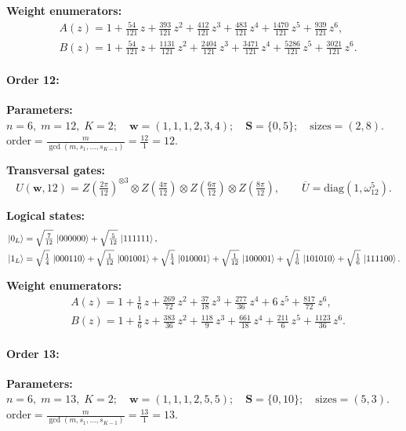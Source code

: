\documentclass[pdflatex,sn-nature]{sn-jnl}%
\theoremstyle{thmstyleone}%
\theoremstyle{thmstyletwo}%
\theoremstyle{thmstylethree}%
\begin{document}
\begin{appendices}
\noindent\textbf{Weight enumerators:}
\begin{align*}
    &A(z) = 1 + \tfrac{54}{121}\,z + \tfrac{393}{121}\,z^{2} + \tfrac{412}{121}\,z^{3} + \tfrac{483}{121}\,z^{4} + \tfrac{1470}{121}\,z^{5} + \tfrac{939}{121}\,z^{6}, \\
    &B(z) = 1 + \tfrac{54}{121}\,z + \tfrac{1131}{121}\,z^{2} + \tfrac{2404}{121}\,z^{3} + \tfrac{3471}{121}\,z^{4} + \tfrac{5286}{121}\,z^{5} + \tfrac{3021}{121}\,z^{6}.
\end{align*}

\paragraph{\textbf{Order 12:}}
\noindent\textbf{Parameters:} $n=6,\; m=12,\; K=2;\quad \mathbf w=(1, 1, 1, 2, 3, 4);\quad \mathbf S=\{0, 5\};\quad \text{sizes}=\left(2, 8\right).$ $\displaystyle \text{order}=\frac{m}{\gcd(m,s_1,\dots,s_{K-1})}=\frac{12}{1}=12.$

\noindent\textbf{Transversal gates:}
\[
    U(\mathbf w,12)=Z \left(\tfrac{2\pi}{12}\right)^{\otimes3} \otimes Z \left(\tfrac{4\pi}{12}\right) \otimes Z \left(\tfrac{6\pi}{12}\right) \otimes Z \left(\tfrac{8\pi}{12}\right),\qquad
    \overline U=\mathrm{diag}(1,\omega_{12}^{5}).
\]

\noindent\textbf{Logical states:}
\begin{align*}
    &\ket{0_L} = \sqrt{\tfrac{7}{12}}\,\ket{000000} + \sqrt{\tfrac{5}{12}}\,\ket{111111}, \\
    &\ket{1_L} = \sqrt{\tfrac{1}{4}}\,\ket{000110} + \sqrt{\tfrac{1}{12}}\,\ket{001001} + \sqrt{\tfrac{1}{4}}\,\ket{010001} + \sqrt{\tfrac{1}{12}}\,\ket{100001} + \sqrt{\tfrac{1}{6}}\,\ket{101010} + \sqrt{\tfrac{1}{6}}\,\ket{111100}.
\end{align*}

\noindent\textbf{Weight enumerators:}
\begin{align*}
    &A(z) = 1 + \tfrac{1}{6}\,z + \tfrac{269}{72}\,z^{2} + \tfrac{37}{18}\,z^{3} + \tfrac{277}{36}\,z^{4} + 6\,z^{5} + \tfrac{817}{72}\,z^{6}, \\
    &B(z) = 1 + \tfrac{1}{6}\,z + \tfrac{383}{36}\,z^{2} + \tfrac{118}{9}\,z^{3} + \tfrac{661}{18}\,z^{4} + \tfrac{211}{6}\,z^{5} + \tfrac{1123}{36}\,z^{6}.
\end{align*}

\paragraph{\textbf{Order 13:}}
\noindent\textbf{Parameters:} $n=6,\; m=13,\; K=2;\quad \mathbf w=(1, 1, 1, 2, 5, 5);\quad \mathbf S=\{0, 10\};\quad \text{sizes}=\left(5, 3\right).$ $\displaystyle \text{order}=\frac{m}{\gcd(m,s_1,\dots,s_{K-1})}=\frac{13}{1}=13.$


\end{appendices}
\end{document}

